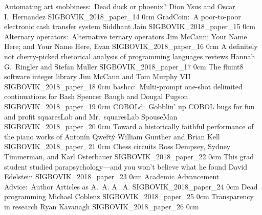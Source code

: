 \addpaper
	{Automating art snobbiness:\ Dead duck or phoenix?}
	{Dion Ysus and Oscar I.\ Hernandez}
	{}
	{SIGBOVIK_2018_paper_14}
	{0cm}
	{}
\addpaper
	{GradCoin:\ A poor-to-poor electronic cash transfer system}
	{Siddhant Jain}
	{}
	{SIGBOVIK_2018_paper_15}
	{0cm}
	{}
\addpaper
	{Alternary operators:\ Alternative ternary operators}
	{Jim McCann; Your Name Here; and Your Name Here, Evan}
	{}
	{SIGBOVIK_2018_paper_16}
	{0cm}
	{}
\addpaper
	{A definitely not cherry-picked rhetorical analysis of programming languages reviews}
	{Hannah G.\ Ringler and Stefan Muller}
	{}
	{SIGBOVIK_2018_paper_17}
	{0cm}
	{}
\addpaper
	{The fluint8 software integer library}
	{Jim McCann and Tom Murphy VII}
	{}
	{SIGBOVIK_2018_paper_18}
	{0cm}
	{}
\addpaper
	{bashcc:\ Multi-prompt one-shot delimited continuations for Bash}
	{Spencer Baugh and Dougal Pugson}
	{}
	{SIGBOVIK_2018_paper_19}
	{0cm}
	{}
\addpaper
	{COBOLd:\ Gobblin' up COBOL bugs for fun and profit}
	{squaresLab and Mr.\ squaresLab SpouseMan}
	{}
	{SIGBOVIK_2018_paper_20}
	{0cm}
	{}
\addpaper
	{Toward a historically faithful performance of the piano works of Anton\'in Qwe\v{r}t\'y}
	{William Gunther and Brian Kell}
	{}
	{SIGBOVIK_2018_paper_21}
	{0cm}
	{}
\addpaper
	{Chess circuits}
	{Ross Dempsey, Sydney Timmerman, and Karl Osterbauer}
	{}
	{SIGBOVIK_2018_paper_22}
	{0cm}
	{}
\addpaper
	{This grad student studied parapsychology---and you won't believe what he found}
	{David Edelstein}
	{}
	{SIGBOVIK_2018_paper_23}
	{0cm}
	{}
\addpaper
	{Academic Advancement Advice:\ Author Articles as A.\ A.}
	{A.\ A.}
	{}
	{SIGBOVIK_2018_paper_24}
	{0cm}
	{}
\addpaper
	{Dead programming}
	{Michael Coblenz}
	{}
	{SIGBOVIK_2018_paper_25}
	{0cm}
	{}
\addpaper
	{Transparency in research}
	{Ryan Kavanagh}
	{}
	{SIGBOVIK_2018_paper_26}
	{0cm}
	{}
